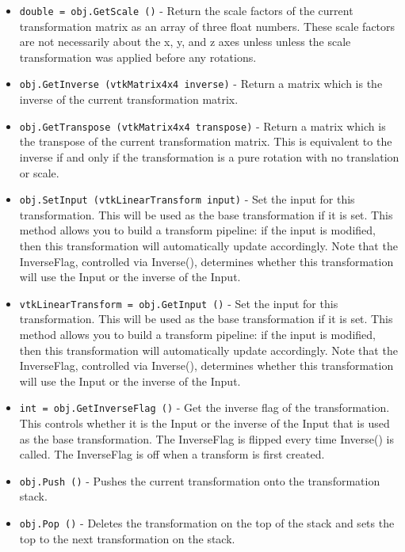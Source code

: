 \begin{itemize}
\item  \verb|double = obj.GetScale ()| -  Return the scale factors of the current transformation matrix as 
 an array of three float numbers.  These scale factors are not necessarily
 about the x, y, and z axes unless unless the scale transformation was
 applied before any rotations.  

\item  \verb|obj.GetInverse (vtkMatrix4x4 inverse)| -  Return a matrix which is the inverse of the current transformation
 matrix.

\item  \verb|obj.GetTranspose (vtkMatrix4x4 transpose)| -  Return a matrix which is the transpose of the current transformation
 matrix.  This is equivalent to the inverse if and only if the 
 transformation is a pure rotation with no translation or scale.

\item  \verb|obj.SetInput (vtkLinearTransform input)| -  Set the input for this transformation.  This will be used as the
 base transformation if it is set.  This method allows you to build
 a transform pipeline: if the input is modified, then this transformation
 will automatically update accordingly.  Note that the InverseFlag,
 controlled via Inverse(), determines whether this transformation
 will use the Input or the inverse of the Input.

\item  \verb|vtkLinearTransform = obj.GetInput ()| -  Set the input for this transformation.  This will be used as the
 base transformation if it is set.  This method allows you to build
 a transform pipeline: if the input is modified, then this transformation
 will automatically update accordingly.  Note that the InverseFlag,
 controlled via Inverse(), determines whether this transformation
 will use the Input or the inverse of the Input.

\item  \verb|int = obj.GetInverseFlag ()| -  Get the inverse flag of the transformation.  This controls
 whether it is the Input or the inverse of the Input that
 is used as the base transformation.  The InverseFlag is
 flipped every time Inverse() is called.  The InverseFlag
 is off when a transform is first created.

\item  \verb|obj.Push ()| -  Pushes the current transformation onto the transformation stack.

\item  \verb|obj.Pop ()| -  Deletes the transformation on the top of the stack and sets the top 
 to the next transformation on the stack.


\end{itemize}
